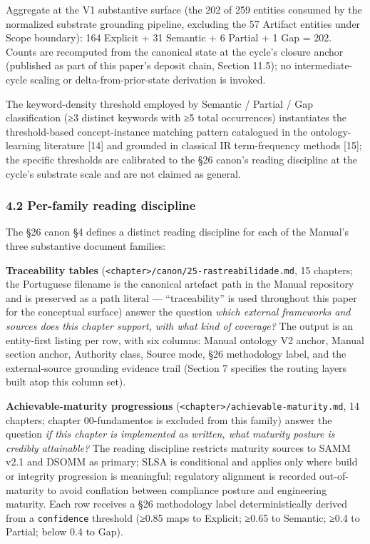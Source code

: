 \documentclass[
]{article}
\begin{document}
Aggregate at the V1 substantive surface (the 202 of 259 entities
consumed by the normalized substrate grounding pipeline, excluding the
57 Artifact entities under Scope boundary): 164 Explicit + 31 Semantic +
6 Partial + 1 Gap = 202. Counts are recomputed from the canonical state
at the cycle's closure anchor (published as part of this paper's deposit
chain, Section 11.5); no intermediate-cycle scaling or
delta-from-prior-state derivation is invoked.

The keyword-density threshold employed by Semantic / Partial / Gap
classification (≥3 distinct keywords with ≥5 total occurrences)
instantiates the threshold-based concept-instance matching pattern
catalogued in the ontology-learning literature {[}14{]} and grounded in
classical IR term-frequency methods {[}15{]}; the specific thresholds
are calibrated to the §26 canon's reading discipline at the cycle's
substrate scale and are not claimed as general.

\subsubsection{4.2 Per-family reading
discipline}\label{per-family-reading-discipline}

The §26 canon §4 defines a distinct reading discipline for each of the
Manual's three substantive document families:

\textbf{Traceability tables}
(\texttt{\textless{}chapter\textgreater{}/canon/25-rastreabilidade.md},
15 chapters; the Portuguese filename is the canonical artefact path in
the Manual repository and is preserved as a path literal ---
``traceability'' is used throughout this paper for the conceptual
surface) answer the question \emph{which external frameworks and sources
does this chapter support, with what kind of coverage?} The output is an
entity-first listing per row, with six columns: Manual ontology V2
anchor, Manual section anchor, Authority class, Source mode, §26
methodology label, and the external-source grounding evidence trail
(Section 7 specifies the routing layers built atop this column set).

\textbf{Achievable-maturity progressions}
(\texttt{\textless{}chapter\textgreater{}/achievable-maturity.md}, 14
chapters; chapter 00-fundamentos is excluded from this family) answer
the question \emph{if this chapter is implemented as written, what
maturity posture is credibly attainable?} The reading discipline
restricts maturity sources to SAMM v2.1 and DSOMM as primary; SLSA is
conditional and applies only where build or integrity progression is
meaningful; regulatory alignment is recorded out-of-maturity to avoid
conflation between compliance posture and engineering maturity. Each row
receives a §26 methodology label deterministically derived from a
\texttt{confidence} threshold (≥0.85 maps to Explicit; ≥0.65 to
Semantic; ≥0.4 to Partial; below 0.4 to Gap).
\end{document}
